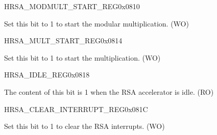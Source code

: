 \begin{register}{H}{RSA\_MODMULT\_START\_REG}{0x0810}\label{regdesc:RSAMODMULTSTARTREG}
%
%
\regnewline%
\begin{regdesc}\begin{reglist}
\item [RSA\_MODMULT\_START] Set this bit to 1 to start the modular multiplication. (WO)
\end{reglist}\end{regdesc}
\end{register}


\begin{register}{H}{RSA\_MULT\_START\_REG}{0x0814}\label{regdesc:RSAMULTSTARTREG}
%
%
\regnewline%
\begin{regdesc}\begin{reglist}
\item [RSA\_MULT\_START] Set this bit to 1 to start the multiplication. (WO)
\end{reglist}\end{regdesc}
\end{register}



\begin{register}{H}{RSA\_IDLE\_REG}{0x0818}\label{regdesc:RSAIDLEREG}
%
%
\regnewline%
\begin{regdesc}\begin{reglist}
\item [RSA\_IDLE] The content of this bit is 1 when the RSA accelerator is idle. (RO)
\end{reglist}\end{regdesc}
\end{register}


\begin{register}{H}{RSA\_CLEAR\_INTERRUPT\_REG}{0x081C}\label{regdesc:RSACLEARINTERRUPTREG}
%
%
\regnewline%
\begin{regdesc}\begin{reglist}
\item [RSA\_CLEAR\_INTERRUPT] Set this bit to 1 to clear the RSA interrupts. (WO)
\end{reglist}\end{regdesc}
\end{register}


